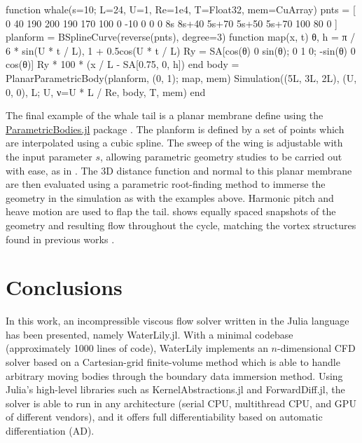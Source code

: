 \documentclass[10pt,a4paper]{article}
\begin{document}
\begin{minipage}{\linewidth}
\begin{jllisting}
function whale(s=10; L=24, U=1, Re=1e4, T=Float32, mem=CuArray)
    pnts = [
        0 40 190   200   190   170   100   0 -10 0
        0  0  8s 8s+40 5s+70 5s+50 5s+70 100  80 0
    ]
    planform = BSplineCurve(reverse(pnts), degree=3)
    function map(x, t)
        θ, h = π / 6 * sin(U * t / L), 1 + 0.5cos(U * t / L)
        Ry = SA[cos(θ) 0 sin(θ); 0 1 0; -sin(θ) 0 cos(θ)]
        Ry * 100 * (x / L - SA[0.75, 0, h])
    end
    body = PlanarParametricBody(planform, (0, 1); map, mem)
    Simulation((5L, 3L, 2L), (U, 0, 0), L; U, ν=U * L / Re, body, T, mem)
end
\end{jllisting}
\end{minipage}

The final example of the whale tail is a planar membrane define using the \href{https://github.com/WaterLily-jl/ParametricBodies.jl}{ParametricBodies.jl} package \citep{WeymouthLauber2023}. The planform is defined by a set of points which are interpolated using a cubic spline. The sweep of the wing is adjustable with the input parameter $s$, allowing parametric geometry studies to be carried out with ease, as in \cite{zurman2021}. The 3D distance function and normal to this planar membrane are then evaluated using a parametric root-finding method to immerse the geometry in the simulation as with the examples above. Harmonic pitch and heave motion are used to flap the tail.  shows equally spaced snapshots of the geometry and resulting flow throughout the cycle, matching the vortex structures found in previous works \citep{zurman2021}.

\section{Conclusions}\label{sec:conclusions}

In this work, an incompressible viscous flow solver written in the Julia language has been presented, namely WaterLily.jl. With a minimal codebase (approximately 1000 lines of code), WaterLily implements an $n$-dimensional CFD solver based on a Cartesian-grid finite-volume method which is able to handle arbitrary moving bodies through the boundary data immersion method. Using Julia's high-level libraries such as KernelAbstractions.jl and ForwardDiff.jl, the solver is able to run in any architecture (serial CPU, multithread CPU, and GPU of different vendors), and it offers full differentiability based on automatic differentiation (AD).
\end{document}
